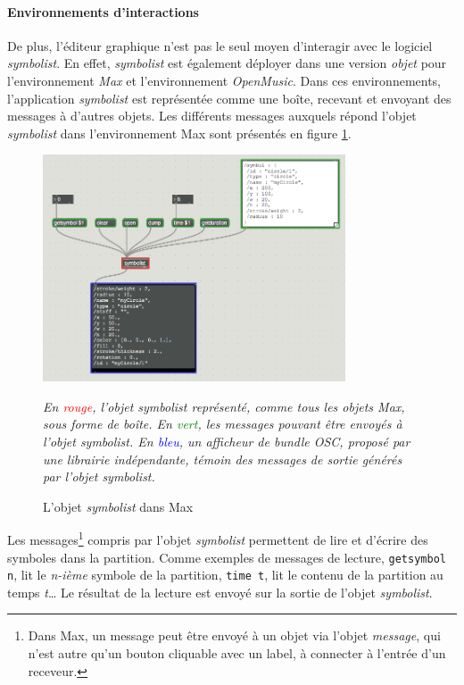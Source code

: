 \paragraph{Environnements d'interactions} De plus, l'éditeur graphique n'est pas le seul moyen d'interagir avec le logiciel \textit{symbolist}. En effet, \textit{symbolist} est également déployer dans une version \textit{objet} pour l'environnement \textit{Max} et l'environnement \textit{OpenMusic}. Dans ces environnements, l'application \textit{symbolist} est représentée comme une boîte, recevant et envoyant des messages à d'autres objets. Les différents messages auxquels répond l'objet \textit{symbolist} dans l'environnement Max sont présentés en figure \ref{fig:symbolistMaxObject}.

\begin{figure}[H]
	\centering
	\includegraphics[keepaspectratio=true, width=0.8\textwidth]{LeProjetSymbolist/i/symbolistMaxObject.png}
	\caption{L'objet \textit{symbolist} dans Max}
	\label{fig:symbolistMaxObject}
	\small
	\it
	En \textcolor{red}{rouge}, l'objet \emph{symbolist} représenté, comme tous les objets \emph{Max}, sous forme de boîte. En \textcolor{green}{vert}, les messages pouvant être envoyés à l'objet \emph{symbolist}.
	En \textcolor{blue}{bleu}, un afficheur de bundle OSC, proposé par une librairie indépendante, témoin des messages de sortie générés par l'objet \emph{symbolist}.  
\end{figure}

Les messages\footnote{Dans Max, un message peut être envoyé à un objet via l'objet \textit{message}, qui n'est autre qu'un bouton cliquable avec un label, à connecter à l'entrée d'un receveur.} compris par l'objet \textit{symbolist} permettent de lire et d'écrire des symboles dans la partition.
Comme exemples de messages de lecture, \lstinline|getsymbol n|, lit le \textit{n-ième} symbole de la partition, \lstinline|time t|, lit le contenu de la partition au temps \textit{t}…
Le résultat de la lecture est envoyé sur la sortie de l'objet \textit{symbolist}.

